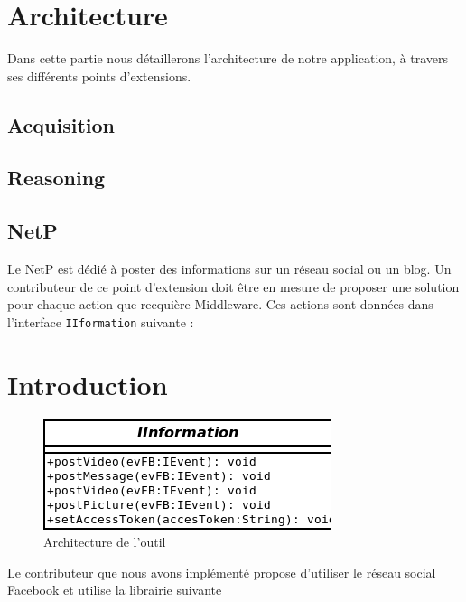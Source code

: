\chapter{Architecture}
Dans cette partie nous détaillerons l'architecture de notre application, à travers ses différents points d'extensions.
\section{Acquisition}

\section{Reasoning}

\section{NetP}
Le  NetP est dédié à poster des informations sur un  réseau social ou un blog. Un contributeur de ce point d'extension doit être en mesure de proposer une solution pour chaque action que recquière Middleware. Ces actions sont données dans l'interface \verb+IIformation+ suivante :
\chapter{Introduction}
   \begin{figure}[htbp]
  \centering
  \includegraphics[scale=0.50]{img/iinterface}
  \caption{Architecture de l'outil}
  \label{fig:archi}
\end{figure}

Le contributeur que nous avons implémenté propose d'utiliser le réseau social Facebook et utilise la librairie suivante \cite{restFB}





